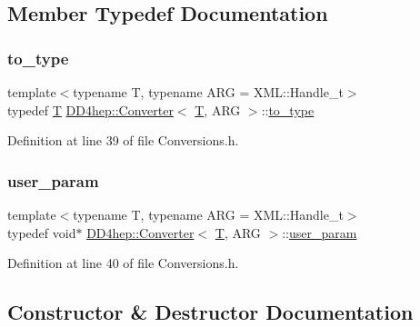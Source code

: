 \subsection{Member Typedef Documentation}
\hypertarget{struct_d_d4hep_1_1_converter_ab6977053b60eb411fc88ac61e7a47832}{}\label{struct_d_d4hep_1_1_converter_ab6977053b60eb411fc88ac61e7a47832} 
\subsubsection{\texorpdfstring{to\+\_\+type}{to\_type}}
{\footnotesize\ttfamily template$<$typename T, typename A\+RG = X\+M\+L\+::\+Handle\+\_\+t$>$ \\
typedef \hyperlink{class_t}{T} \hyperlink{struct_d_d4hep_1_1_converter}{D\+D4hep\+::\+Converter}$<$ \hyperlink{class_t}{T}, A\+RG $>$\+::\hyperlink{struct_d_d4hep_1_1_converter_ab6977053b60eb411fc88ac61e7a47832}{to\+\_\+type}}



Definition at line 39 of file Conversions.\+h.

\hypertarget{struct_d_d4hep_1_1_converter_a13a876ea9cfcadf85a3dadd32e97a834}{}\label{struct_d_d4hep_1_1_converter_a13a876ea9cfcadf85a3dadd32e97a834} 
\subsubsection{\texorpdfstring{user\+\_\+param}{user\_param}}
{\footnotesize\ttfamily template$<$typename T, typename A\+RG = X\+M\+L\+::\+Handle\+\_\+t$>$ \\
typedef void$\ast$ \hyperlink{struct_d_d4hep_1_1_converter}{D\+D4hep\+::\+Converter}$<$ \hyperlink{class_t}{T}, A\+RG $>$\+::\hyperlink{struct_d_d4hep_1_1_converter_a13a876ea9cfcadf85a3dadd32e97a834}{user\+\_\+param}}



Definition at line 40 of file Conversions.\+h.



\subsection{Constructor \& Destructor Documentation}
\hypertarget{struct_d_d4hep_1_1_converter_ab693f490d06d475fb15dc360ed45015f}{}\label{struct_d_d4hep_1_1_converter_ab693f490d06d475fb15dc360ed45015f} 
